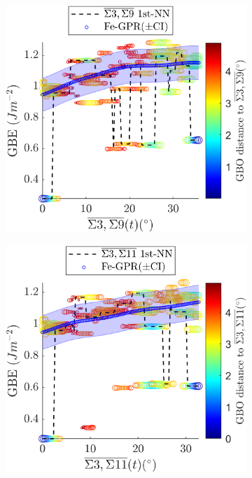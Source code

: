\documentclass[final,twocolumn,12pt]{elsarticle}
\begin{document}
\begin{figure}[!htb]
		\begin{subfigure}[b]{0.4\textwidth}
			\includegraphics[width=\textwidth]{figures/tunnel-3-9-kim.png}
			\caption{}
			\label{fig:tunnel-3-9-kim}
		\end{subfigure}
		\begin{subfigure}[b]{0.4\textwidth}
			\includegraphics[width=\textwidth]{figures/tunnel-3-11-kim.png}

\end{subfigure}
\end{figure}
\end{document}
